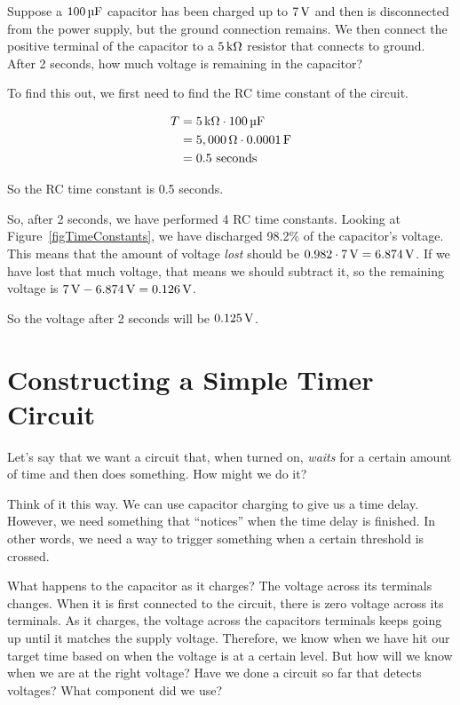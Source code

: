\begin{exampleprob}
Suppose a $100\,\si{\micro\farad}$ capacitor has been charged up to $7\,\si{\volt}$ and then is disconnected from the power supply, but the ground connection remains.
We then connect the positive terminal of the capacitor to a $5\,\si{\kilo\ohm}$ resistor that connects to ground.
After 2 seconds, how much voltage is remaining in the capacitor?

To find this out, we first need to find the RC time constant of the circuit.

\begin{align*}
T &= 5\,\si{\kilo\ohm} \cdot 100\,\si{\micro\farad} \\
  &= 5,000\,\si{\ohm} \cdot 0.0001\,\si{\farad} \\
  &= 0.5\textrm{ seconds}
\end{align*}

So the RC time constant is 0.5 seconds.

So, after 2 seconds, we have performed 4 RC time constants.
Looking at Figure~\ref{figTimeConstants}, we have discharged 98.2\% of the capacitor's voltage.
This means that the amount of voltage \emph{lost} should be $0.982 \cdot 7\,\si{\volt} = 6.874\,\si{\volt}$.
If we have lost that much voltage, that means we should subtract it, so the remaining voltage is $7\,\si{\volt} - 6.874\,\si{\volt} = 0.126\,\si{\volt}$.

So the voltage after 2 seconds will be $0.125\,\si{\volt}$.
\end{exampleprob}

\section{Constructing a Simple Timer Circuit}

Let's say that we want a circuit that, when turned on, \emph{waits} for a certain amount of time and then does something.
How might we do it?

Think of it this way.  
We can use capacitor charging to give us a time delay.
However, we need something that ``notices'' when the time delay is finished.
In other words, we need a way to trigger something when a certain threshold is crossed.

What happens to the capacitor as it charges?
The voltage across its terminals changes.
When it is first connected to the circuit, there is zero voltage across its terminals.
As it charges, the voltage across the capacitors terminals keeps going up until it matches the supply voltage.
Therefore, we know when we have hit our target time based on when the voltage is at a certain level.
But how will we know when we are at the right voltage?
Have we done a circuit so far that detects voltages?
What component did we use?

